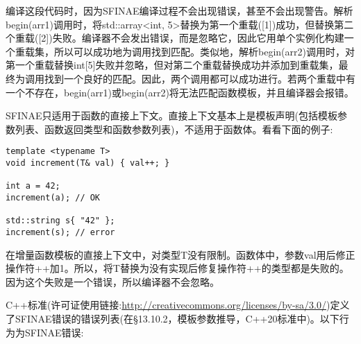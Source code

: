 编译这段代码时，因为SFINAE编译过程不会出现错误，甚至不会出现警告。解析begin(arr1)调用时，将std::array<int, 5>替换为第一个重载([1])成功，但替换第二个重载([2])失败。编译器不会发出错误，而是忽略它，因此它用单个实例化构建一个重载集，所以可以成功地为调用找到匹配。类似地，解析begin(arr2)调用时，对第一个重载替换int[5]失败并忽略，但对第二个重载替换成功并添加到重载集，最终为调用找到一个良好的匹配。因此，两个调用都可以成功进行。若两个重载中有一个不存在，begin(arr1)或begin(arr2)将无法匹配函数模板，并且编译器会报错。

SFINAE只适用于函数的直接上下文。直接上下文基本上是模板声明(包括模板参数列表、函数返回类型和函数参数列表)，不适用于函数体。看看下面的例子:

\begin{lstlisting}[style=styleCXX]
template <typename T>
void increment(T& val) { val++; }

int a = 42;
increment(a); // OK

std::string s{ "42" };
increment(s); // error
\end{lstlisting}

在增量函数模板的直接上下文中，对类型T没有限制。函数体中，参数val用后修正操作符++加1。所以，将T替换为没有实现后修复操作符++的类型都是失败的。因为这个失败是一个错误，所以编译器不会忽略。

C++标准(许可证使用链接:\url{http://creativecommons.org/licenses/by-sa/3.0/})定义了SFINAE错误的错误列表(在§13.10.2，模板参数推导，C++20标准中)。以下行为为SFINAE错误:


